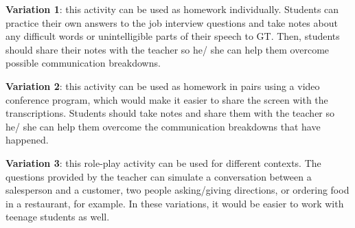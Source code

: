 \documentclass[english]{textolivre}
\begin{document}
\begin{description}
    \item \textbf{Variation 1}: this activity can be used as homework individually. Students can practice their own answers to the job interview questions and take notes about any difficult words or unintelligible parts of their speech to GT. Then, students should share their notes with the teacher so he/ she can help them overcome possible communication breakdowns.
    \item \textbf{Variation 2}: this activity can be used as homework in pairs using a video conference program, which would make it easier to share the screen with the transcriptions. Students should take notes and share them with the teacher so he/ she can help them overcome the communication breakdowns that have happened.
    \item \textbf{Variation 3}: this role-play activity can be used for different contexts. The questions provided by the teacher can simulate a conversation between a salesperson and a customer, two people asking/giving directions, or ordering food in a restaurant, for example. In these variations, it would be easier to work with teenage students as well.
\end{description}
 
\end{document}
